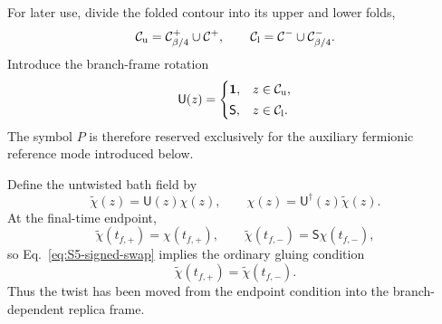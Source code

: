 \documentclass[11pt,a4paper]{article}
\begin{document}
For later use, divide the folded contour into its upper and lower folds,
\begin{equation}
  \mathcal C_{\rm u}
  =
  \mathcal C^+_{\beta/4}\cup\mathcal C^+,
  \qquad
  \mathcal C_{\rm l}
  =
  \mathcal C^-\cup\mathcal C^-_{\beta/4}.
\label{eq:S5-upper-lower-folds}
\end{equation}
Introduce the branch-frame rotation
\begin{equation}
  \mathsf U(z)
  =
  \begin{cases}
    \mathbf 1,
    &z\in\mathcal C_{\rm u},
    \\[2pt]
    \mathsf S,
    &z\in\mathcal C_{\rm l}.
  \end{cases}
\label{eq:S5-branch-rotation}
\end{equation}
The symbol \(P\) is therefore reserved exclusively for the auxiliary
fermionic reference mode introduced below.

Define the untwisted bath field by
\begin{equation}
  \widetilde\chi(z)
  =
  \mathsf U(z)\chi(z),
  \qquad
  \chi(z)
  =
  \mathsf U^\dagger(z)\widetilde\chi(z).
\label{eq:S5-untwisted-bath-field}
\end{equation}
At the final-time endpoint,
\[
  \widetilde\chi(t_{f,+})
  =
  \chi(t_{f,+}),
  \qquad
  \widetilde\chi(t_{f,-})
  =
  \mathsf S\chi(t_{f,-}),
\]
so Eq.~\eqref{eq:S5-signed-swap} implies the ordinary gluing condition
\begin{equation}
  \widetilde\chi(t_{f,+})
  =
  \widetilde\chi(t_{f,-}).
\label{eq:S5-untwisted-bath-gluing}
\end{equation}
Thus the twist has been moved from the endpoint condition into the
branch-dependent replica frame.
\end{document}
